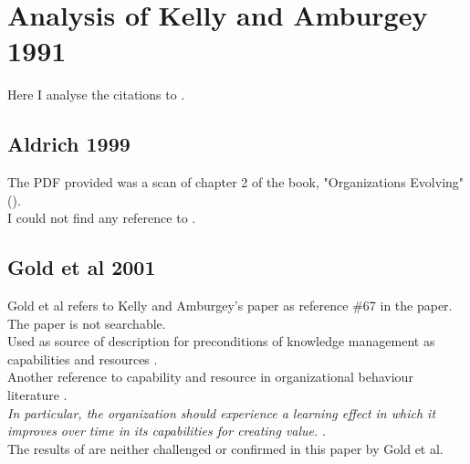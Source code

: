 \section{Analysis of Kelly and Amburgey 1991}

Here I analyse the citations to \cite{kelly1991organizational}.\\

\subsection{Aldrich 1999}

The PDF provided was a scan of chapter 2 of the book, "Organizations Evolving" (\cite{aldrich1999organizations}). \\

I could not find any reference to \cite{kelly1991organizational}.\\

\subsection{Gold et al 2001}

Gold et al \cite{gold2001knowledge} refers to Kelly and Amburgey's paper as reference \#67 in the paper. The paper is not searchable. \\

Used as source of description for preconditions of knowledge management as capabilities and resources \cite[p.186]{gold2001knowledge}.\\

Another reference to capability and resource in organizational behaviour literature \cite[p.192]{gold2001knowledge}.\\

\textit{In particular, the organization should experience a learning effect in which it improves over time in its capabilities for creating value.} \cite[p.196]{gold2001knowledge}.\\

The results of \cite{kelly1991organizational} are neither challenged or confirmed in this paper by Gold et al. \\

